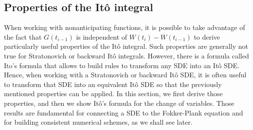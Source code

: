 \subsection{Properties of the Itô integral}
When working with nonanticipating functions, it is possible to take advantage of the fact that $G(t_{i-1})$ is independent of $W(t_i) - W(t_{i-1})$ to derive particularly useful properties of the Itô integral. Such properties are generally not true for Stratonovich or backward Itô integrals. However, there is a formula called Ito's formula that allows to build rules to transform any SDE into an Itô SDE. Hence, when working with a Stratonovich or backward Itô SDE, it is often useful to transform that SDE into an equivalent Itô SDE so that the previously mentioned properties can be applied. In this section, we first derive those properties, and then we show Itô's formula for the change of variables. Those results are fundamental for connecting a SDE to the Fokker-Plank equation and for building consistent numerical schemes, as we shall see later.
